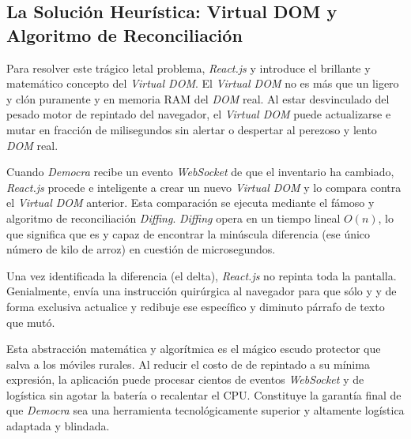\subsection{La Solución Heurística: Virtual DOM y Algoritmo de Reconciliación}

Para resolver este trágico letal problema, \textit{React.js} y introduce el brillante y matemático concepto del \textit{Virtual DOM}. El \textit{Virtual DOM} no es más que un ligero y clón puramente y en memoria RAM del \textit{DOM} real. Al estar desvinculado del pesado motor de repintado del navegador, el \textit{Virtual DOM} puede actualizarse e mutar en fracción de milisegundos sin alertar o despertar al perezoso y lento \textit{DOM} real.

Cuando \textit{Democra} recibe un evento \textit{WebSocket} de que el inventario ha cambiado, \textit{React.js} procede e inteligente a crear un nuevo \textit{Virtual DOM} y lo compara contra el \textit{Virtual DOM} anterior. Esta comparación se ejecuta mediante el fámoso y algoritmo de reconciliación \textit{Diffing}. \textit{Diffing} opera en un tiempo lineal $O(n)$, lo que significa que es y capaz de encontrar la minúscula diferencia (ese único número de kilo de arroz) en cuestión de microsegundos.

Una vez identificada la diferencia (el delta), \textit{React.js} no repinta toda la pantalla. Genialmente, envía una instrucción quirúrgica al navegador para que sólo y y de forma exclusiva actualice y redibuje ese específico y diminuto párrafo de texto que mutó.

Esta abstracción matemática y algorítmica es el mágico escudo protector que salva a los móviles rurales. Al reducir el costo de de repintado a su mínima expresión, la aplicación puede procesar cientos de eventos \textit{WebSocket} y de logística sin agotar la batería o recalentar el CPU. Constituye la garantía final de que \textit{Democra} sea una herramienta tecnológicamente superior y altamente logística adaptada y blindada.
